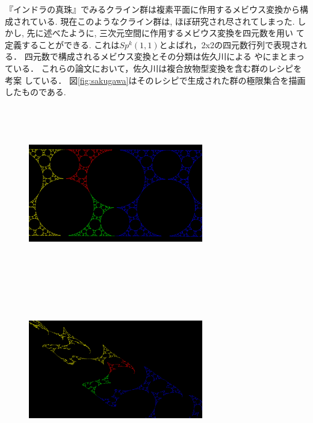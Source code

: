 『インドラの真珠』でみるクライン群は複素平面に作用するメビウス変換から構成されている.
現在このようなクライン群は, ほぼ研究され尽されてしまった.
しかし, 先に述べたように, 三次元空間に作用するメビウス変換を四元数を用い
て定義することができる.
これは$Sp^k(1, 1)$とよばれ，2x2の四元数行列で表現される．
四元数で構成されるメビウス変換とその分類は佐久川による
\cite{sakugawa2007master}や\cite{sakugawa2009accidental}にまとまっている．
これらの論文において，佐久川は複合放物型変換を含む群のレシピを考案
している．
図\ref{fig:sakugawa}はそのレシピで生成された群の極限集合を描画したものである.

\begin{figure}[h!tbp]
 \begin{minipage}{0.49\hsize}
  \center
  \includegraphics[width=3in, height=3in, keepaspectratio]{../img/klein/sakugawa1.pdf}
  \subcaption{}
 \end{minipage}
 \hspace*{\fill}
 \begin{minipage}{0.49\hsize}
  \center
  \includegraphics[width=3in, height=3in, keepaspectratio]{../img/klein/sakugawa2.pdf}

\end{minipage}
\end{figure}
